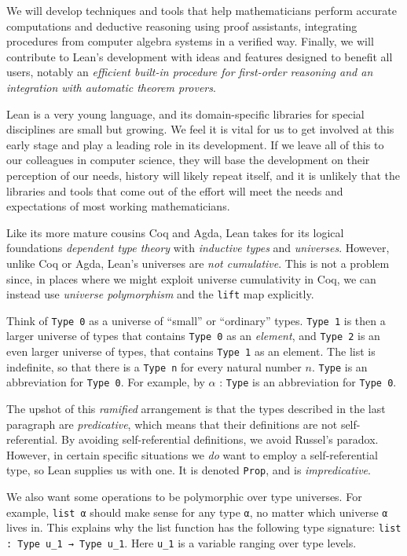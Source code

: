 \documentclass[12pt]{amsart}  %
\begin{document}
We will develop techniques and tools that help mathematicians perform accurate computations and deductive reasoning using proof assistants, integrating procedures from computer algebra systems in a verified way. Finally, we will contribute to Lean's development with ideas and features designed to benefit all users, notably an \emph{efficient built-in procedure for first-order reasoning and an integration with automatic theorem provers}. 

Lean is a very young language, and its domain-specific libraries for special disciplines are small but growing. We feel it is vital for us to get involved at this early stage and play a leading  role in its development.  If we leave all of this to our colleagues in computer science, they will base the development on their perception of our needs, history will likely repeat itself, and 
it is unlikely that the libraries and tools that come out of the effort will meet the needs and expectations of most working mathematicians.

Like its more mature cousins Coq and Agda, Lean takes for its logical foundations \emph{dependent type theory} with \emph{inductive types} and \emph{universes}. However, unlike Coq or Agda, Lean's universes are \emph{not cumulative}. This is not a problem since, in places where we might exploit universe cumulativity in Coq, we can instead use \emph{universe polymorphism} and the \lstinline{lift} map explicitly. 


Think of  \lstinline{Type 0} as a universe of ``small'' or ``ordinary'' types.  \lstinline{Type 1} is then a larger universe of types that contains \lstinline{Type 0} as an \emph{element}, and  \lstinline{Type 2} is an even larger universe of types, that contains  \lstinline{Type 1} as an element. The list is indefinite, so that there is a  \lstinline{Type n} for every natural number $n$. \lstinline{Type} is an abbreviation for  \lstinline{Type 0}. For example, by $\alpha$ : \lstinline{Type} is an abbreviation for  \lstinline{Type 0}.


The upshot of this \emph{ramified} arrangement is that the types described in the last paragraph are \emph{predicative}, which means that their definitions are not 
self-referential.  By avoiding self-referential definitions, we avoid Russel's paradox. However, in certain specific situations we \emph{do} want to employ a self-referential type, so Lean supplies us with one. It is denoted \lstinline{Prop}, and is \emph{impredicative}.

We also want some operations to be polymorphic over type universes. For example,  \lstinline{list α} should make sense for any type  \lstinline{α}, no matter which universe  \lstinline{α} lives in. This explains why the list function has the following type signature: \lstinline{list : Type u_1 → Type u_1}. Here \lstinline{u_1} is a variable ranging over type levels. 
\end{document}
